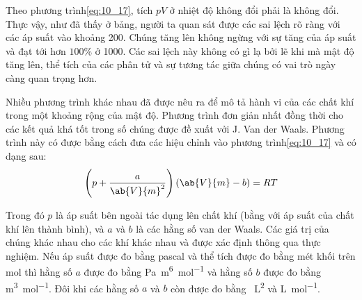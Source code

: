 
Theo phương trình\eqref{eq:10_17}, tích $pV$ ở nhiệt độ không đổi phải là không đổi. Thực vậy, như đã thấy ở bảng, người ta quan sát được các sai lệch rõ ràng với các áp suất vào khoảng \SI{200}{\atm}. Chúng tăng lên không ngừng với sự tăng của áp suất và đạt tới hơn $100$\% ở \SI{1000}{\atm}. Các sai lệch này không có gì lạ bởi lẽ khi mà mật độ tăng lên, thể tích của các phân tử và sự tương tác giữa chúng có vai trò ngày càng quan trọng hơn.    


Nhiều phương trình khác nhau đã được nêu ra để mô tả hành vi của các chất khí trong một khoảng rộng của mật độ. Phương trình đơn giản nhất đồng thời cho các kết quả khá tốt trong số chúng được đề xuất vởi J. Van der Waals. Phương trình này có được bằng cách đưa các hiệu chỉnh vào phương trình\eqref{eq:10_17} và có dạng sau:
\begin{equation}\label{eq:10_62}
	\left(p+\frac{a}{\ab{V}{m}^2}\right)(\ab{V}{m} - b) = RT
\end{equation}

\noindent

Trong đó $p$ là áp suất bên ngoài tác dụng lên chất khí (bằng với áp suất của chất khí lên thành bình), và $a$ và $b$ là các hằng số van der Waals. Các giá trị của chúng khác nhau cho các khí khác nhau và được xác định thông qua thực nghiệm. Nếu áp suất được đo bằng pascal và thể tích được đo bằng mét khối trên mol thì hằng số $a$ được đo bằng \si{\pascal~\metre^6~\mole^{-1}} và hằng số $b$ được đo bằng \si{\metre\cubed\per\mole}. Đôi khi các hằng số $a$ và $b$ còn được đo bằng \si{\atm\liter\squared} và \si{\liter\per\mole}.   

